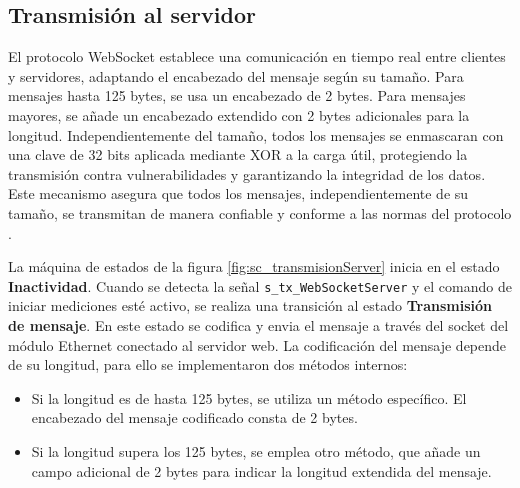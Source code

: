 \subsection{Transmisión al servidor}

El protocolo WebSocket establece una comunicación en tiempo real entre clientes y servidores, adaptando el encabezado del mensaje según su tamaño. Para mensajes hasta 125 bytes, se usa un encabezado de 2 bytes. Para mensajes mayores, se añade un encabezado extendido con 2 bytes adicionales para la longitud. Independientemente del tamaño, todos los mensajes se enmascaran con una clave de 32 bits aplicada mediante XOR a la carga útil, protegiendo la transmisión contra vulnerabilidades y garantizando la integridad de los datos. Este mecanismo asegura que todos los mensajes, independientemente de su tamaño, se transmitan de manera confiable y conforme a las normas del protocolo \cite{websockeWiki}. 



La máquina de estados de la figura \ref{fig:sc_transmisionServer} inicia en el estado \textbf{Inactividad}. Cuando se detecta la señal \texttt{s\_tx\_WebSocketServer} y el comando de iniciar mediciones esté activo, se realiza una transición al estado \textbf{Transmisión de mensaje}. En este estado se codifica y envia el mensaje a través del socket del módulo Ethernet conectado al servidor web. La codificación del mensaje depende de su longitud, para ello se implementaron dos métodos internos:
\begin{itemize}
  \item Si la longitud es de hasta 125 bytes, se utiliza un método específico. El encabezado del mensaje codificado consta de 2 bytes.
  \item Si la longitud supera los 125 bytes, se emplea otro método, que añade un campo adicional de 2 bytes para indicar la longitud extendida del mensaje.
\end{itemize}

